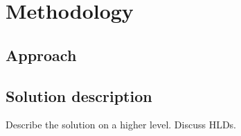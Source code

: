 
\chapter{Methodology}

\section{Approach}


\section{Solution description}

Describe the solution on a higher level. Discuss HLDs.